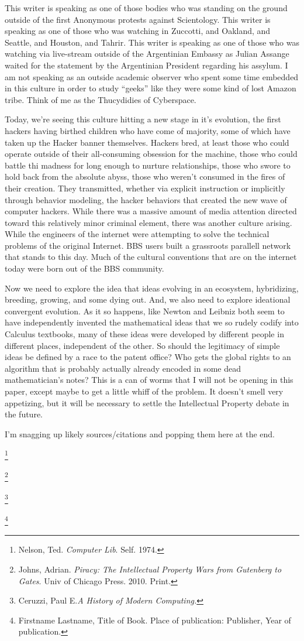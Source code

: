 \documentclass[11pt]{article}
\begin{document}
This writer is speaking as one of those bodies who was standing on the ground outside of the first Anonymous protests against Scientology. This writer is speaking as one of those who was watching in Zuccotti, and Oakland, and Seattle, and Houston, and Tahrir. This writer is speaking as one of those who was watching via live-stream outside of the Argentinian Embassy as Julian Assange waited for the statement by the Argentinian President regarding his assylum. I am not speaking as an outside academic observer who spent some time embedded in this culture in order to study “geeks” like they were some kind of lost Amazon tribe. Think of me as the Thucydidies of Cyberspace.

Today, we’re seeing this culture hitting a new stage in it's evolution, the first hackers having birthed children who have come of majority, some of which have taken up the Hacker banner themselves. Hackers bred, at least those who could operate outside of their all-consuming obsession for the machine, those who could battle thi madness for long enough to nurture relationships, those who swore to hold back from the absolute abyss, those who weren’t consumed in the fires of their creation. They transmitted, whether via explicit instruction or implicitly through behavior modeling, the hacker behaviors that created the new wave of computer hackers.  While there was a massive amount of media attention directed toward this relatively minor criminal element, there was another culture arising. While the engineers of the internet were attempting to solve the technical problems of the original Internet. BBS users built a grassroots parallell network that stands to this day. Much of the cultural conventions that are on the internet today were born out of the BBS community.

Now we need to explore the idea that ideas evolving in an ecosystem, hybridizing, breeding, growing, and some dying out. And, we also need to explore ideational convergent evolution. As it so happens, like Newton and Leibniz both seem to have independently invented the mathematical ideas that we so rudely codify into Calculus textbooks, many of these ideas were developed by different people in different places, independent of the other. So should the legitimacy of simple ideas be defined by a race to the patent office? Who gets the global rights to an algorithm that is probably actually already encoded in some dead mathematician’s notes? This is a can of worms that I will not be opening in this paper, except maybe to get a little whiff of the problem. It doesn’t smell very appetizing, but it will be necessary to settle the Intellectual Property debate in the future.

I'm snagging up likely sources/citations and popping them here at the end.

\footnote{Nelson, Ted. \emph{Computer Lib}. Self. 1974.}

\footnote{Johns, Adrian. \emph{Piracy: The Intellectual Property Wars from Gutenberg to Gates}. Univ of Chicago Press. 2010. Print.}

\footnote{Ceruzzi, Paul E.\emph{A History of Modern Computing.}}

\footnote{Firstname Lastname, Title of Book. Place of  publication: Publisher, Year of publication.}
\end{document}

